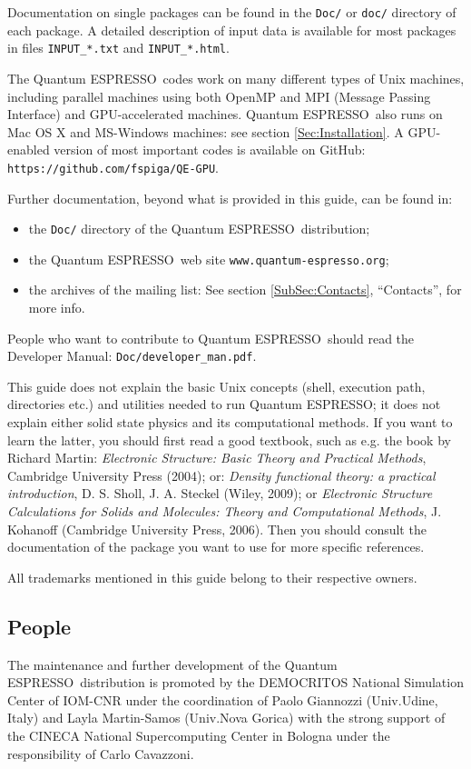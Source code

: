 \documentclass[12pt,a4paper]{article}
\def\qe{{\sc Quantum ESPRESSO}}
\begin{document}
Documentation on single packages can be found in the \texttt{Doc/} or
\texttt{doc/} directory of each package. A detailed description of input
data is available for most packages in files \texttt{INPUT\_*.txt} and 
\texttt{INPUT\_*.html}.

The \qe\ codes work on many different types of Unix machines,
including parallel machines using both OpenMP and MPI 
(Message Passing Interface) and GPU-accelerated machines.
\qe\ also runs on Mac OS X and MS-Windows machines:
see section \ref{Sec:Installation}. A GPU-enabled version
of most important codes is available on GitHub:
\texttt{https://github.com/fspiga/QE-GPU}.

Further documentation, beyond what is provided in this guide, can be found in:
\begin{itemize}
  \item the \texttt{Doc/} directory of the \qe\ distribution;
  \item the \qe\ web site \texttt{www.quantum-espresso.org};
  \item the archives of the  mailing list:
   See section \ref{SubSec:Contacts}, ``Contacts'', for more info.
\end{itemize}
People who want to contribute to \qe\ should read the 
Developer Manual: \texttt{Doc/developer\_man.pdf}.

This guide does not explain the basic Unix concepts (shell, execution 
path, directories etc.) and utilities needed to run \qe; it does not 
explain either solid state physics and its computational methods.
If you want to learn the latter, you should first read a good textbook, 
such as e.g. the book by Richard Martin:
{\em Electronic Structure: Basic Theory and Practical Methods},
Cambridge University Press (2004); or:
{\em Density functional theory: a practical introduction}, 
D. S. Sholl, J. A. Steckel (Wiley, 2009); or
{\em Electronic Structure Calculations for Solids and Molecules:
Theory and Computational Methods}, 
J. Kohanoff (Cambridge University Press, 2006). Then you should consult
the documentation of the package you want to use for more specific references.

All trademarks mentioned in this guide belong to their respective owners.

\subsection{People}

The maintenance and further development of the \qe\ distribution
is promoted by the DEMOCRITOS National Simulation Center 
of IOM-CNR under the coordination of
Paolo Giannozzi (Univ.Udine, Italy) and Layla Martin-Samos 
(Univ.Nova Gorica) with the strong support
of the CINECA National Supercomputing Center in Bologna under 
the responsibility of Carlo Cavazzoni.
\end{document}
